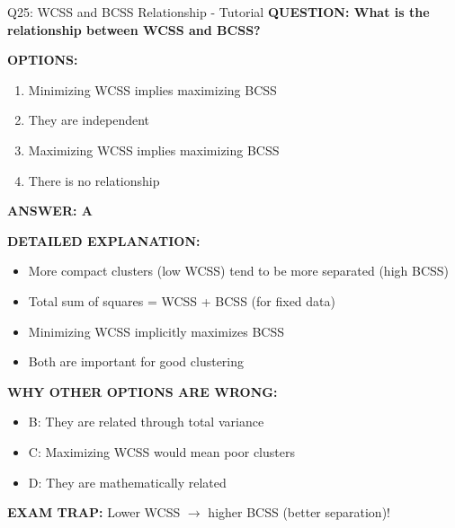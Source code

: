 \documentclass[8pt]{beamer}
\begin{document}
	\begin{frame}{Q25: WCSS and BCSS Relationship - Tutorial}
		\fontsize{6.5}{7.5}\selectfont
		\textbf{QUESTION: What is the relationship between WCSS and BCSS?}
		
		\vspace{0.1cm}
		\textbf{OPTIONS:}
		\begin{enumerate}
			\item Minimizing WCSS implies maximizing BCSS
			\item They are independent
			\item Maximizing WCSS implies maximizing BCSS
			\item There is no relationship
		\end{enumerate}
		
		\vspace{0.1cm}
		\textcolor{myblue}{\textbf{ANSWER: A}}
		
		\vspace{0.1cm}
		\textbf{DETAILED EXPLANATION:}
		\begin{itemize}
			\item More compact clusters (low WCSS) tend to be more separated (high BCSS)
			\item Total sum of squares = WCSS + BCSS (for fixed data)
			\item Minimizing WCSS implicitly maximizes BCSS
			\item Both are important for good clustering
		\end{itemize}
		
		\vspace{0.1cm}
		\textcolor{myred}{\textbf{WHY OTHER OPTIONS ARE WRONG:}}
		\begin{itemize}
			\item \textcolor{myred}{B:} They are related through total variance
			\item \textcolor{myred}{C:} Maximizing WCSS would mean poor clusters
			\item \textcolor{myred}{D:} They are mathematically related
		\end{itemize}
		
		\textcolor{myred}{\textbf{EXAM TRAP:}} Lower WCSS $\to$ \textcolor{myblue}{higher BCSS} (better separation)!
	\end{frame}
	
\end{document}
